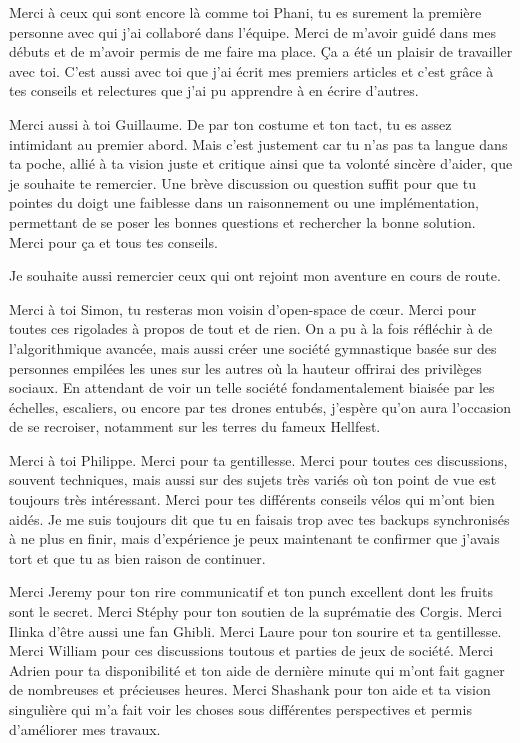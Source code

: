 Merci à ceux qui sont encore là comme toi Phani, tu es surement la première personne avec qui j'ai collaboré dans l'équipe. Merci de m'avoir guidé dans mes débuts et de m'avoir permis de me faire ma place. Ça a été un plaisir de travailler avec toi. C'est aussi avec toi que j'ai écrit mes premiers articles et c'est grâce à tes conseils et relectures que j'ai pu apprendre à en écrire d'autres. 

Merci aussi à toi Guillaume. 
De par ton costume et ton tact, tu es assez intimidant au premier abord. 
Mais c'est justement car tu n'as pas ta langue dans ta poche, allié à ta vision juste et critique ainsi que ta volonté sincère d'aider, que je souhaite te remercier. Une brève discussion ou question suffit pour que tu pointes du doigt une faiblesse dans un raisonnement ou une implémentation, permettant de se poser les bonnes questions et rechercher la bonne solution. Merci pour ça et tous tes conseils.



Je souhaite aussi remercier ceux qui ont rejoint mon aventure en cours de route.  

Merci à toi Simon, tu resteras mon voisin d'open-space de cœur. Merci pour toutes ces rigolades à propos de tout et de rien. On a pu à la fois réfléchir à de l'algorithmique avancée, mais aussi créer une société gymnastique basée sur des personnes empilées les unes sur les autres où la hauteur offrirai des privilèges sociaux. En attendant de voir un telle société fondamentalement biaisée par les échelles, escaliers, ou encore par tes drones entubés, j'espère qu'on aura l'occasion de se recroiser, notamment sur les terres du fameux Hellfest.

Merci à toi Philippe. Merci pour ta gentillesse. Merci pour toutes ces discussions, souvent techniques, mais aussi sur des sujets très variés où ton point de vue est toujours très intéressant. Merci pour tes différents conseils vélos qui m'ont bien aidés. 
Je me suis toujours dit que tu en faisais trop avec tes backups synchronisés à ne plus en finir, mais d'expérience je peux maintenant te confirmer que j'avais tort et que tu as bien raison de continuer.   

Merci Jeremy pour ton rire communicatif et ton punch excellent dont les fruits sont le secret. 
Merci Stéphy pour ton soutien de la suprématie des Corgis. 
Merci Ilinka d'être aussi une fan Ghibli. 
Merci Laure pour ton sourire et ta gentillesse.
Merci William pour ces discussions toutous et parties de jeux de société. 
Merci Adrien pour ta disponibilité et ton aide de dernière minute qui m'ont fait gagner de nombreuses et précieuses heures.
Merci Shashank pour ton aide et ta vision singulière qui m'a fait voir les choses sous différentes perspectives et permis d'améliorer mes travaux. 

